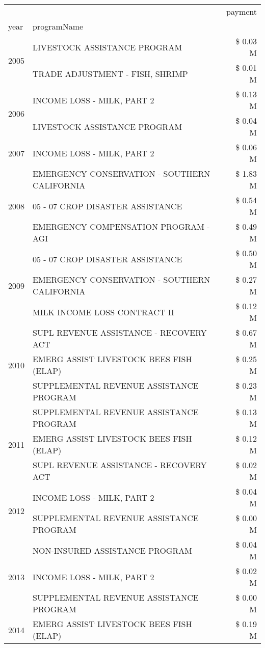 \begin{tabular}{llr}
\toprule
 &  & payment \\
year & programName &  \\
\midrule
\multirow[t]{2}{*}{2005} & LIVESTOCK ASSISTANCE PROGRAM & \$ 0.03 M \\
 & TRADE ADJUSTMENT - FISH, SHRIMP & \$ 0.01 M \\
\cline{1-3}
\multirow[t]{2}{*}{2006} & INCOME LOSS - MILK, PART 2 & \$ 0.13 M \\
 & LIVESTOCK ASSISTANCE PROGRAM & \$ 0.04 M \\
\cline{1-3}
2007 & INCOME LOSS - MILK, PART 2 & \$ 0.06 M \\
\cline{1-3}
\multirow[t]{3}{*}{2008} & EMERGENCY CONSERVATION - SOUTHERN CALIFORNIA & \$ 1.83 M \\
 & 05 - 07 CROP DISASTER ASSISTANCE & \$ 0.54 M \\
 & EMERGENCY COMPENSATION PROGRAM - AGI & \$ 0.49 M \\
\cline{1-3}
\multirow[t]{3}{*}{2009} & 05 - 07 CROP DISASTER ASSISTANCE & \$ 0.50 M \\
 & EMERGENCY CONSERVATION - SOUTHERN CALIFORNIA & \$ 0.27 M \\
 & MILK INCOME LOSS CONTRACT II & \$ 0.12 M \\
\cline{1-3}
\multirow[t]{3}{*}{2010} & SUPL REVENUE ASSISTANCE - RECOVERY ACT & \$ 0.67 M \\
 & EMERG ASSIST LIVESTOCK BEES FISH (ELAP) & \$ 0.25 M \\
 & SUPPLEMENTAL REVENUE ASSISTANCE PROGRAM & \$ 0.23 M \\
\cline{1-3}
\multirow[t]{3}{*}{2011} & SUPPLEMENTAL REVENUE ASSISTANCE PROGRAM & \$ 0.13 M \\
 & EMERG ASSIST LIVESTOCK BEES FISH (ELAP) & \$ 0.12 M \\
 & SUPL REVENUE ASSISTANCE - RECOVERY ACT & \$ 0.02 M \\
\cline{1-3}
\multirow[t]{2}{*}{2012} & INCOME LOSS - MILK, PART 2 & \$ 0.04 M \\
 & SUPPLEMENTAL REVENUE ASSISTANCE PROGRAM & \$ 0.00 M \\
\cline{1-3}
\multirow[t]{3}{*}{2013} & NON-INSURED ASSISTANCE PROGRAM & \$ 0.04 M \\
 & INCOME LOSS - MILK, PART 2 & \$ 0.02 M \\
 & SUPPLEMENTAL REVENUE ASSISTANCE PROGRAM & \$ 0.00 M \\
\cline{1-3}
\multirow[t]{2}{*}{2014} & EMERG ASSIST LIVESTOCK BEES FISH (ELAP) & \$ 0.19 M \\

\end{tabular}
